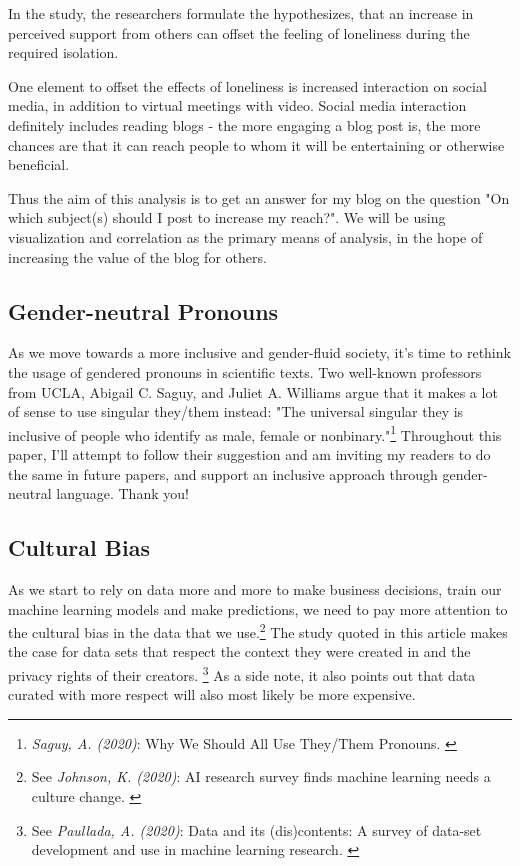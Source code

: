 In the study, the researchers formulate the hypothesizes, that an increase in perceived support from others can offset the feeling of loneliness during the required isolation.

One element to offset the effects of loneliness is increased interaction on social media, in addition to virtual meetings with video. Social media interaction definitely includes reading blogs - the more engaging a blog post is, the more chances are that it can reach people to whom it will be entertaining or otherwise beneficial.

Thus the aim of this analysis is to get an answer for my blog on the question "On which subject(s) should I post to increase my reach?". We will be using visualization and correlation as the primary means of analysis, in the hope of increasing the value of the blog for others.

\subsection{Gender-neutral Pronouns}

As we move towards a more inclusive and gender-fluid society, it's time to rethink the usage of gendered pronouns in scientific texts. Two well-known professors from UCLA, Abigail C. Saguy, and Juliet A. Williams argue that it makes a lot of sense to use singular they/them instead: "The universal singular they is inclusive of people who identify as male, female or nonbinary."\footnote{\textit{Saguy, A. (2020)}: Why We Should All Use They/Them Pronouns. \cite{pronouns}} Throughout this paper, I'll attempt to follow their suggestion and am inviting my readers to do the same in future papers, and support an inclusive approach through gender-neutral language. Thank you!

\subsection{Cultural Bias}

As we start to rely on data more and more to make business decisions, train our machine learning models and make predictions, we need to pay more attention to the cultural bias in the data that we use.\footnote{See \textit{Johnson, K. (2020)}: AI research survey finds machine learning needs a culture change. \cite{aiResearch}} The study quoted in this article makes the case for data sets that respect the context they were created in and the privacy rights of their creators. \footnote{See \textit{Paullada, A. (2020)}: Data and its (dis)contents: A survey of data-set development and use in machine learning research. \cite{cornellStudy}} As a side note, it also points out that data curated with more respect will also most likely be more expensive.

